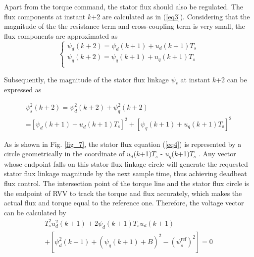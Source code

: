 \documentclass[sn-basic]{sn-jnl}
\theoremstyle{thmstyleone}%
\theoremstyle{thmstyletwo}%
\theoremstyle{thmstylethree}%
\theoremstyle{thmstyleone}%
\begin{document}
Apart from the torque command, the stator flux should also be regulated. The flux components at instant $k$+2 are calculated as in (\ref{eq3}). Considering that the magnitude of the the resistance term and cross-coupling term is very small{\cite{5766036}}, the flux components are approximated as
\begin{equation}\label{eq1}
\left\{ \begin{matrix}
{\psi_{d}\left( {k + 2} \right) = \psi_{d}\left( {k + 1} \right) + u_{d}\left( {k + 1} \right)T_{s}} \\
{\psi_{q}\left( {k + 2} \right) = \psi_{q}\left( {k + 1} \right) + u_{q}\left( {k + 1} \right)T_{s}} \\
\end{matrix} \right.
\end{equation}


Subsequently, the magnitude of the stator flux linkage $\psi_s$ at instant $k$+2 can be expressed as


\begin{equation}\label{eq4}
\begin{array}{c}
\psi_{s}^{2}\left( {k + 2} \right) = \psi_{d}^{2}\left( {k + 2} \right) + \psi_{q}^{2}\left( {k + 2} \right)\\
 \text{=}{{\left[ \psi_{d}^{{}}\left( k+1 \right)+u_{d}^{{}}\left( k+1 \right){{T}_{\text{s}}} \right]}^{2}}+{{\left[ \psi _{q}^{{}}\left( k+1 \right)+u_{q}^{{}}\left( k+1 \right){{T}_{\text{s}}} \right]}^{2}} 
 \end{array}
\end{equation}



As is shown in Fig. \ref{fig_7}, the stator flux equation (\ref{eq4}) is represented by a circle geometrically in the coordinate of $u_d$($k$+1)$T_s$ - $u_q$($k$+1)$T_s$ \cite{7815310}. Any vector whose endpoint falls on this stator flux linkage circle will generate the requested stator flux linkage magnitude by the next sample time, thus achieving deadbeat flux control. The intersection point of the torque line and the stator flux circle is the endpoint of RVV to track the torque and flux accurately, which makes the actual flux and torque equal to the reference one. Therefore, the voltage vector can be calculated by
\begin{equation}\label{34}
\begin{array}{c}
T_{s}^{2} u_{d}^{2}(k+1)+2 \psi_{d}(k+1) T_{s} u_{d}(k+1)  \\
+\left[\psi_{d}^{2}(k+1)+\left(\psi_{q}(k+1)+B\right)^{2}-\left(\psi_{s}^{\mathrm{ref}}\right)^{2}\right]=0
\end{array}
\end{equation}
\end{document}
